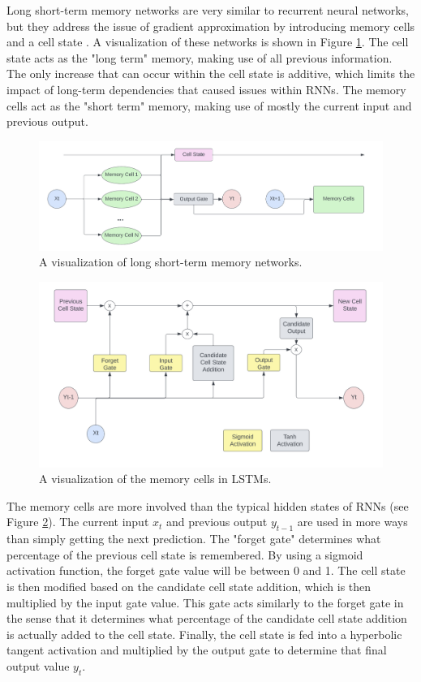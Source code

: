 Long short-term memory networks are very similar to recurrent neural networks, but they address the issue of gradient approximation by introducing memory cells and a cell state \citep{hochreiter1997long}. A visualization of these networks is shown in Figure \ref{fig:LSTM}. The cell state acts as the "long term" memory, making use of all previous information. The only increase that can occur within the cell state is additive, which limits the impact of long-term dependencies that caused issues within RNNs. The memory cells act as the "short term" memory, making use of mostly the current input and previous output.

\begin{figure}[ht]
    \centering
    \includegraphics[width=0.8\linewidth]{"Figures/LSTM_Architecture.png"}
    \caption{A visualization of long short-term memory networks.}
    \label{fig:LSTM}
\end{figure}

\begin{figure}[ht]
    \centering
    \includegraphics[width=0.6\linewidth]{"Figures/LSTM_Memory_Cell.png"}
    \caption{A visualization of the memory cells in LSTMs.}
    \label{fig:MemoryCells}
\end{figure}

The memory cells are more involved than the typical hidden states of RNNs (see Figure \ref{fig:MemoryCells}). The current input $x_t$ and previous output $y_{t-1}$ are used in more ways than simply getting the next prediction. The "forget gate" determines what percentage of the previous cell state is remembered. By using a sigmoid activation function, the forget gate value will be between 0 and 1. The cell state is then modified based on the candidate cell state addition, which is then multiplied by the input gate value. This gate acts similarly to the forget gate in the sense that it determines what percentage of the candidate cell state addition is actually added to the cell state. Finally, the cell state is fed into a hyperbolic tangent activation and multiplied by the output gate to determine that final output value $y_t$.


